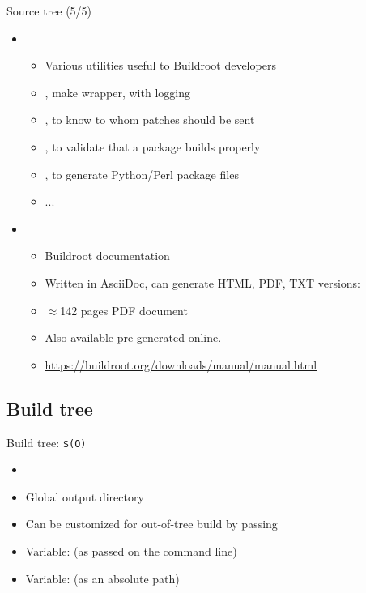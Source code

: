 \begin{frame}{Source tree (5/5)}
  \begin{itemize}
  \item {}
    \begin{itemize}
    \item Various utilities useful to Buildroot developers
    \item {}, make wrapper, with logging
    \item {}, to know to whom patches should be sent
    \item {}, to validate that a package builds properly
    \item {},  to generate Python/Perl
      package  files
    \item ...
    \end{itemize}
  \item {}
    \begin{itemize}
    \item Buildroot documentation
    \item Written in AsciiDoc, can generate HTML, PDF, TXT versions:
    \item $\approx$142 pages PDF document
    \item Also available pre-generated online.
    \item \url{https://buildroot.org/downloads/manual/manual.html}
    \end{itemize}
  \end{itemize}
\end{frame}

\subsection{Build tree}

\begin{frame}{Build tree: {\tt \$(O)}}
  \begin{itemize}
  \item {}
  \item Global output directory
  \item Can be customized for out-of-tree build by passing 
  \item Variable:  (as passed on the command line)
  \item Variable:  (as an absolute path)
  \end{itemize}
\end{frame}

